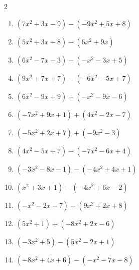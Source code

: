 \begin{multicols}{2}
\begin{enumerate}
  \item $(7x^{2}+3x-9)-(-9x^{2}+5x+8)$


  \item $(5x^{2}+3x-8)-(6x^{2}+9x)$


  \item $(6x^{2}-7x-3)-(-x^{2}-3x+5)$


  \item $(9x^{2}+7x+7)-(-6x^{2}-5x+7)$


  \item $(6x^{2}-9x+9)+(-x^{2}-9x-6)$


  \item $(-7x^{2}+9x+1)+(4x^{2}-2x-7)$


  \item $(-5x^{2}+2x+7)+(-9x^{2}-3)$


  \item $(4x^{2}-5x+7)-(-7x^{2}-6x+4)$


  \item $(-3x^{2}-8x-1)-(-4x^{2}+4x+1)$


  \item $(x^{2}+3x+1)-(-4x^{2}+6x-2)$


  \item $(-x^{2}-2x-7)-(9x^{2}+2x+8)$


  \item $(5x^{2}+1)+(-8x^{2}+2x-6)$


  \item $(-3x^{2}+5)-(5x^{2}-2x+1)$


  \item $(-8x^{2}+4x+6)-(-x^{2}-7x-8)$


\end{enumerate}
\end{multicols}
